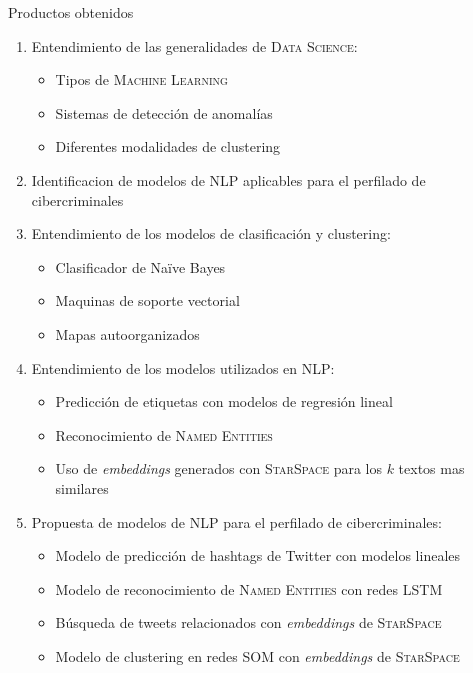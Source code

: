 \documentclass[10pt]{beamer}
\begin{document}
\begin{frame}[allowframebreaks]{Productos obtenidos}
  \begin{enumerate}
  \item Entendimiento de las generalidades de \textsc{Data Science}:
    \begin{itemize}
    \item Tipos de \textsc{Machine Learning}
    \item Sistemas de detección de anomalías
    \item Diferentes modalidades de clustering
    \end{itemize}
  \item Identificacion de modelos de \textsc{NLP} aplicables para el perfilado de cibercriminales
    
  \item Entendimiento de los modelos de clasificación y clustering:
    \begin{itemize}
    \item Clasificador de Na\"ive Bayes
    \item Maquinas de soporte vectorial
    \item Mapas autoorganizados
    \end{itemize}
    
  \item Entendimiento de los modelos utilizados en \textsc{NLP}:
    \begin{itemize}
    \item Predicción de etiquetas con modelos de regresión lineal
    \item Reconocimiento de \textsc{Named Entities}
    \item Uso de \emph{embeddings} generados con \textsc{StarSpace} para los $k$ textos mas similares
    \end{itemize}
    
  \item Propuesta de modelos de \textsc{NLP} para el perfilado de cibercriminales:
    \begin{itemize}
    \item Modelo de predicción de hashtags de Twitter con modelos lineales
    \item Modelo de reconocimiento de \textsc{Named Entities} con redes \textsc{LSTM}
    \item Búsqueda de tweets relacionados con \emph{embeddings} de \textsc{StarSpace}
    \item Modelo de clustering en redes \textsc{SOM} con \emph{embeddings} de \textsc{StarSpace}
    \end{itemize}
    
  \end{enumerate}
\end{frame}
\end{document}
